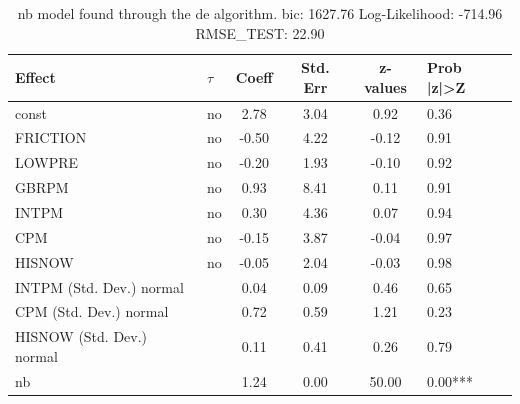 \begin{table}
	\caption{nb model found through the de algorithm. bic: 1627.76 Log-Likelihood: -714.96 RMSE_TEST: 22.90}
	\begin{center}
		\begin{tabular}{|l|l|c|c|c|l|}
			\hline
			Effect & $\tau$ & Coeff & Std. Err & z-values & Prob |z|>Z \\
			\hline
			const & no & 2.78 & 3.04 & 0.92 & 0.36 \\
			\hline
			FRICTION & no & -0.50 & 4.22 & -0.12 & 0.91 \\
			\hline
			LOWPRE & no & -0.20 & 1.93 & -0.10 & 0.92 \\
			\hline
			GBRPM & no & 0.93 & 8.41 & 0.11 & 0.91 \\
			\hline
			INTPM & no & 0.30 & 4.36 & 0.07 & 0.94 \\
			\hline
			CPM & no & -0.15 & 3.87 & -0.04 & 0.97 \\
			\hline
			HISNOW & no & -0.05 & 2.04 & -0.03 & 0.98 \\
			\hline
			INTPM (Std. Dev.) normal &  & 0.04 & 0.09 & 0.46 & 0.65 \\
			\hline
			CPM (Std. Dev.) normal &  & 0.72 & 0.59 & 1.21 & 0.23 \\
			\hline
			HISNOW (Std. Dev.) normal &  & 0.11 & 0.41 & 0.26 & 0.79 \\
			\hline
			nb &  & 1.24 & 0.00 & 50.00 & 0.00*** \\
			\hline
		\end{tabular}
	\end{center}
\end{table}